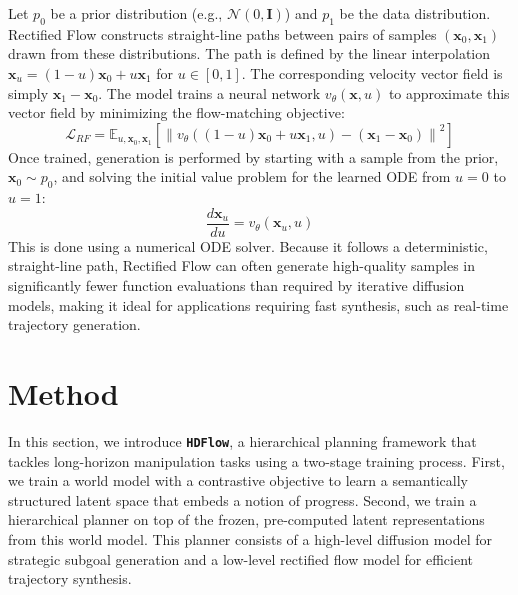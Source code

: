 \documentclass{article} %
\begin{document}
Let $p_0$ be a prior distribution (e.g., $\mathcal{N}(0, \mathbf{I})$) and $p_1$ be the data distribution. Rectified Flow constructs straight-line paths between pairs of samples $(\mathbf{x}_0, \mathbf{x}_1)$ drawn from these distributions. The path is defined by the linear interpolation $\mathbf{x}_u = (1-u)\mathbf{x}_0 + u\mathbf{x}_1$ for $u \in [0, 1]$. The corresponding velocity vector field is simply $\mathbf{x}_1 - \mathbf{x}_0$. The model trains a neural network $v_\theta(\mathbf{x}, u)$ to approximate this vector field by minimizing the flow-matching objective:
\begin{equation}
\label{eq:4}
    \mathcal{L}_{RF} = \mathbb{E}_{u, \mathbf{x}_0, \mathbf{x}_1} \left[ \left\| v_\theta((1-u)\mathbf{x}_0 + u\mathbf{x}_1, u) - (\mathbf{x}_1 - \mathbf{x}_0) \right\|^2 \right]
\end{equation}
Once trained, generation is performed by starting with a sample from the prior, $\mathbf{x}_0 \sim p_0$, and solving the initial value problem for the learned ODE from $u=0$ to $u=1$:
\begin{equation}
    \frac{d\mathbf{x}_u}{du} = v_\theta(\mathbf{x}_u, u)
\end{equation}
This is done using a numerical ODE solver. Because it follows a deterministic, straight-line path, Rectified Flow can often generate high-quality samples in significantly fewer function evaluations than required by iterative diffusion models, making it ideal for applications requiring fast synthesis, such as real-time trajectory generation.

\section{Method}
\vspace{-8pt}
In this section, we introduce \texttt{\textbf{HDFlow}}, a hierarchical planning framework that tackles long-horizon manipulation tasks using a two-stage training process. First, we train a world model with a contrastive objective to learn a semantically structured latent space that embeds a notion of progress. Second, we train a hierarchical planner on top of the frozen, pre-computed latent representations from this world model. This planner consists of a high-level diffusion model for strategic subgoal generation and a low-level rectified flow model for efficient trajectory synthesis.
\end{document}
